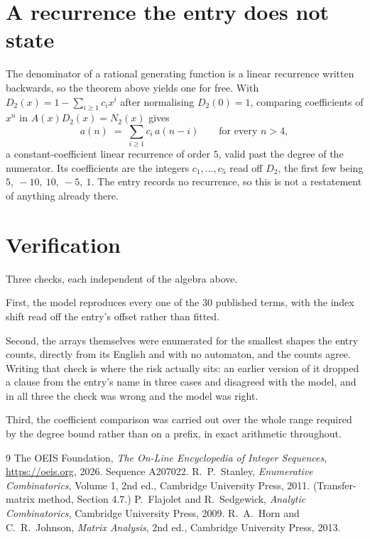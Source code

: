 \documentclass[11pt,a4paper]{article}
\theoremstyle{plain}
\theoremstyle{definition}
\begin{document}
\section{A recurrence the entry does not state}

The denominator of a rational generating function is a linear recurrence written backwards, so
the theorem above yields one for free. With $D_2(x)=1-\sum_{i\ge1}c_ix^i$ after normalising
$D_2(0)=1$, comparing coefficients of $x^n$ in $A(x)D_2(x)=N_2(x)$ gives
\[
a(n)\;=\;\sum_{i\ge1}c_i\,a(n-i)\qquad\text{for every }n>4,
\]
a constant-coefficient linear recurrence of order $5$, valid past the degree of the
numerator. Its coefficients are the integers $c_1,\dots,c_{5}$ read off $D_2$, the first few being $5,\ -10,\ 10,\ -5,\ 1$. The entry records no recurrence, so this is not a restatement of anything
already there.

\section{Verification}

Three checks, each independent of the algebra above.

First, the model reproduces every one of the $30$ published terms, with the index shift
read off the entry's offset rather than fitted.

Second, the arrays themselves were enumerated for the smallest shapes the entry counts,
directly from its English and with no automaton, and the counts agree. Writing that check is
where the risk actually sits: an earlier version of it dropped a clause from the entry's name
in three cases and disagreed with the model, and in all three the check was wrong and the model
was right.

Third, the coefficient comparison was carried out over the whole range required by the degree
bound rather than on a prefix, in exact arithmetic throughout.

\begin{thebibliography}{9}
 The OEIS Foundation, \emph{The On-Line Encyclopedia of Integer
Sequences}, \url{https://oeis.org}, 2026. Sequence A207022.
 R.~P.~Stanley, \emph{Enumerative Combinatorics}, Volume 1, 2nd ed.,
Cambridge University Press, 2011. (Transfer-matrix method, Section 4.7.)
 P.~Flajolet and R.~Sedgewick, \emph{Analytic Combinatorics}, Cambridge
University Press, 2009.
 R.~A.~Horn and C.~R.~Johnson, \emph{Matrix Analysis}, 2nd ed., Cambridge
University Press, 2013.
\end{thebibliography}
\end{document}

